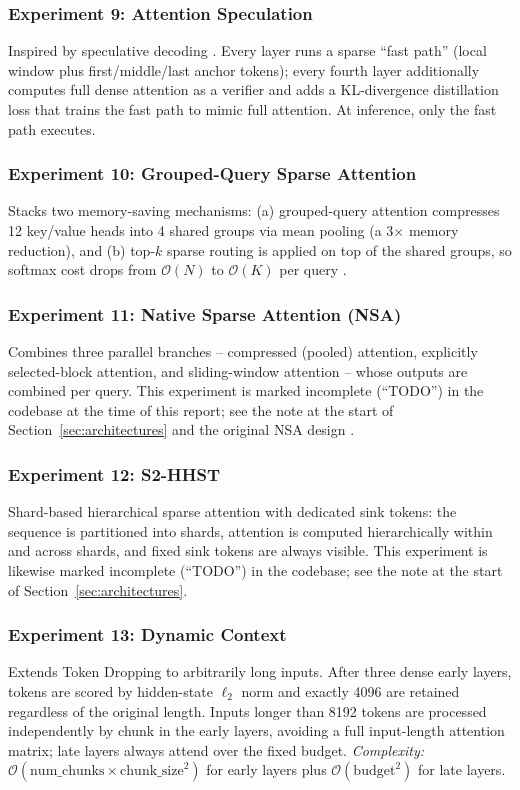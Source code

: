 \documentclass[11pt]{article}
\newcommand{\bigO}{\mathcal{O}}
\begin{document}
\subsubsection*{Experiment 9: Attention Speculation}
\label{exp:speculation}
Inspired by speculative decoding \citep{leviathan2023speculative}. Every layer runs a sparse ``fast path''
(local window plus first/middle/last anchor tokens); every fourth layer
additionally computes full dense attention as a verifier and adds a
KL-divergence distillation loss that trains the fast path to mimic full
attention. At inference, only the fast path executes.

\subsubsection*{Experiment 10: Grouped-Query Sparse Attention}
\label{exp:gqa}
Stacks two memory-saving mechanisms: (a) grouped-query attention compresses
12 key/value heads into 4 shared groups via mean pooling (a 3$\times$ memory
reduction), and (b) top-$k$ sparse routing is applied on top of the shared
groups, so softmax cost drops from $\bigO(N)$ to $\bigO(K)$ per query
\citep{ainslie2023gqa}.

\subsubsection*{Experiment 11: Native Sparse Attention (NSA)}
\label{exp:nsa}
Combines three parallel branches -- compressed (pooled) attention, explicitly
selected-block attention, and sliding-window attention -- whose outputs are
combined per query. This experiment is marked incomplete (``TODO'') in the
codebase at the time of this report; see the note at the start of
Section~\ref{sec:architectures} and the original NSA design
\citep{yuan2025nsa}.

\subsubsection*{Experiment 12: S2-HHST}
\label{exp:s2hhst}
Shard-based hierarchical sparse attention with dedicated sink tokens: the
sequence is partitioned into shards, attention is computed hierarchically
within and across shards, and fixed sink tokens are always visible. This
experiment is likewise marked incomplete (``TODO'') in the codebase; see the
note at the start of Section~\ref{sec:architectures}.

\subsubsection*{Experiment 13: Dynamic Context}
\label{exp:dynamic-context}
Extends Token Dropping to arbitrarily long inputs. After three dense early
layers, tokens are scored by hidden-state $\ell_2$ norm and exactly 4096 are
retained regardless of the original length. Inputs longer than 8192 tokens
are processed independently by chunk in the early layers, avoiding a full
input-length attention matrix; late layers always attend over the fixed
budget. \emph{Complexity:}
$\bigO(\mathrm{num\_chunks}\times\mathrm{chunk\_size}^2)$ for early layers
plus $\bigO(\mathrm{budget}^2)$ for late layers.
\end{document}
